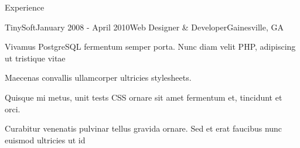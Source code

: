 \documentclass{resume} %
\begin{document}
\begin{rSection}{Experience}

\begin{rSubsection}{TinySoft}{January 2008 - April 2010}{Web Designer \& Developer}{Gainesville, GA}
\item Vivamus PostgreSQL fermentum semper porta. Nunc diam velit PHP, adipiscing ut tristique vitae
\item Maecenas convallis ullamcorper ultricies stylesheets.
\item Quisque mi metus, unit tests CSS ornare sit amet fermentum et, tincidunt et orci.
\item Curabitur venenatis pulvinar tellus gravida ornare. Sed et erat faucibus nunc euismod ultricies ut id
\end{rSubsection}

\end{rSection}





\end{document}
